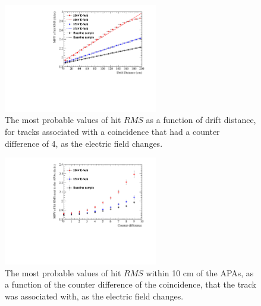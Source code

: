 \begin{figure}
  \centering
  \includegraphics[width=0.6\textwidth]{Canvas_CountDiff4_All_Positions_ElecField}
  \caption[The drift distance dependence of diffusion in the 35 ton dataset and Monte Carlo for coincidences with a counter difference of 4, as the electric field changes]
          {The most probable values of hit $RMS$ as a function of drift distance, for tracks associated with a coincidence that had a counter difference of 4, as the electric field changes.}
  \label{fig:DiffElecStudy_CDiff4}
\end{figure}

\begin{figure}
  \centering
  \includegraphics[width=0.6\textwidth]{Canvas_All_Angles_RMS0cm_ElecField}
  \caption[The angular dependence of diffusion in the 35 ton dataset and Monte Carlo for hits within 10 cm of the APAs, as the electric field changes]
          {The most probable values of hit $RMS$ within 10 cm of the APAs, as a function of the counter difference of the coincidence, that the track was associated with, as the electric field changes.}
  \label{fig:DiffElecStudy_RMS0cm}
\end{figure}


